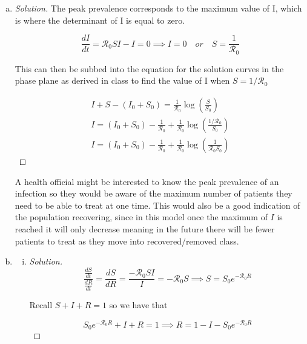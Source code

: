 \documentclass[12pt]{article}
\begin{document}
\basicSIRanalIntro
\begin{enumerate}[(a)]
\item \basicSIRanalQa

{\color{blue}
\begin{proof}[Solution]
	The peak prevalence corresponds to the maximum value of I, which is where the determinant of I is equal to zero. 
	
	\begin{equation}
	\frac{dI}{dt}=\mathcal{R}_0 SI-I=0 \implies I=0 \quad or \quad  S=\frac{1}{\mathcal{R}_0}
	\end{equation}
	
	This can then be subbed into the equation for the solution curves in the phase plane as derived in class to find the value of I when $S=1/\mathcal{R}_0$
	
	\begin{gather}
	I+S-(I_0+S_0)=\frac{1}{\mathcal{R}_0}\log\left(\frac{S}{S_0}\right) \\
	I=(I_0+S_0)-\frac{1}{\mathcal{R}_0}+\frac{1}{\mathcal{R}_0}\log\left(\frac{1/\mathcal{R}_0}{S_0}\right) \\
	I=(I_0+S_0)-\frac{1}{\mathcal{R}_0}+\frac{1}{\mathcal{R}_0}\log\left(\frac{1}{\mathcal{R}_0S_0}\right)
	\end{gather}
\end{proof}
A health official might be interested to know the peak prevalence of an infection so they would be aware of the maximum number of patients they need to be able to treat at one time. This would also be a good indication of the population recovering, since in this model once the maximum of $I$ is reached it will only decrease meaning in the future there will be fewer patients to treat as they move into recovered/removed class.
}

\item \basicSIRanalQb
  \begin{enumerate}[(i)]
  \item \basicSIRanalQbi

{\color{blue}
\begin{proof}[Solution]

	\begin{equation}
	\frac{\frac{dS}{dt}}{\frac{dR}{dt}} = \frac{dS}{dR} = \frac{-\mathcal{R}_0SI}{I} = -\mathcal{R}_0S \implies S=S_0e^{-\mathcal{R}_0R}
	\end{equation}
	
	Recall $S+I+R=1$ so we have that
	
	\begin{equation}
	S_0e^{-\mathcal{R}_0R}+I+R = 1 \implies R=1-I-S_0e^{-\mathcal{R}_0R}
	\end{equation}
	

\end{proof}}
\end{enumerate}
\end{enumerate}
\end{document}
